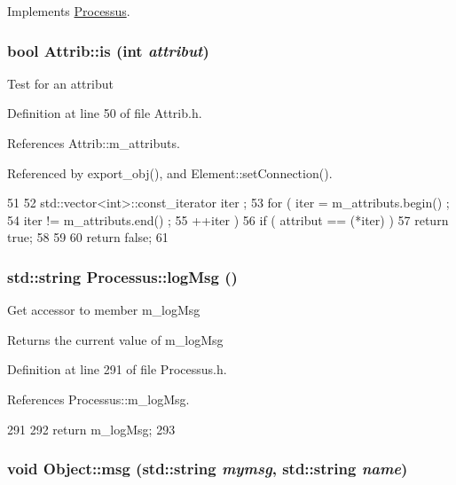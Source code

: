 Implements \hyperlink{classProcessus_aee88ad7b77ae7319cf8b128e9dd2ea11}{Processus}.\hypertarget{classAttrib_a704f26af560909ad22065083bb7d4c34}{
\subsubsection[{is}]{\setlength{\rightskip}{0pt plus 5cm}bool Attrib::is (int {\em attribut})}}
\label{classAttrib_a704f26af560909ad22065083bb7d4c34}
Test for an attribut 

Definition at line 50 of file Attrib.h.

References Attrib::m\_\-attributs.

Referenced by export\_\-obj(), and Element::setConnection().


\begin{DoxyCode}
51   {
52     std::vector<int>::const_iterator iter ;
53     for ( iter  = m_attributs.begin() ;
54           iter != m_attributs.end()   ;
55           ++iter ) {
56       if ( attribut == (*iter) ) {
57         return true;
58       }
59     }
60     return false;
61   }
\end{DoxyCode}
\hypertarget{classProcessus_a42fdeb17dc13ba854222666b6aa29b61}{
\subsubsection[{logMsg}]{\setlength{\rightskip}{0pt plus 5cm}std::string Processus::logMsg ()}}
\label{classProcessus_a42fdeb17dc13ba854222666b6aa29b61}
Get accessor to member m\_\-logMsg \begin{DoxyReturn}{Returns}
the current value of m\_\-logMsg 
\end{DoxyReturn}


Definition at line 291 of file Processus.h.

References Processus::m\_\-logMsg.


\begin{DoxyCode}
291                       {
292     return m_logMsg;
293   }
\end{DoxyCode}
\hypertarget{classObject_ac5d59299273cee27aacf7de00d2e7034}{
\subsubsection[{msg}]{\setlength{\rightskip}{0pt plus 5cm}void Object::msg (std::string {\em mymsg}, \/  std::string {\em name})}}
\label{classObject_ac5d59299273cee27aacf7de00d2e7034}


